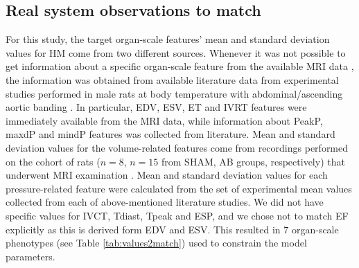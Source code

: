%
%
%
\subsection{Real system observations to match}
For this study, the target organ-scale features' mean and standard deviation values for HM come from two different sources. Whenever it was not possible to get information about a specific organ-scale feature from the available MRI data \cite{Roe:2017}, the information was obtained from available literature data from experimental studies performed in male rats at body temperature with abdominal/ascending aortic banding \cite{Nemeth:2016, Sato:1990, Schunkert:1995, Loot:2005, Liu:2014, Ku:2014, Ruppert:2018, Schunkert:1990, Ruppert:2016}. In particular, EDV, ESV, ET and IVRT features were immediately available from the MRI data, while information about PeakP, maxdP and mindP features was collected from literature. Mean and standard deviation values for the volume-related features come from recordings performed on the cohort of rats ($n=8$, $n=15$ from SHAM, AB groups, respectively) that underwent MRI examination \cite{Roe:2017}. Mean and standard deviation values for each pressure-related feature were calculated from the set of experimental mean values collected from each of above-mentioned literature studies. We did not have specific values for IVCT, Tdiast, Tpeak and ESP, and we chose not to match EF explicitly as this is derived form EDV and ESV. This resulted in $7$ organ-scale phenotypes (see Table \ref{tab:values2match}) used to constrain the model parameters.

